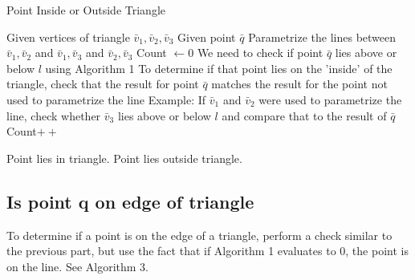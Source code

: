 \documentclass[a4paper,10pt]{scrartcl}
\begin{document}
   
\begin{algorithm}[h!]
  \caption{Point Inside or Outside Triangle}\label{}
  \begin{algorithmic}
    \State Given vertices of triangle $\bar v_1, \bar v_2, \bar v_3$
    \State Given point $\bar q$
    \State Parametrize the lines between $\bar v_1, \bar v_2$ and $\bar v_1, \bar v_3$ and $\bar v_2, \bar v_3$
    \State Count $\gets 0$
      \State We need to check if point $\bar q$ lies above or below $l$ using Algorithm 1
      \State To determine if that point lies on the 'inside' of the triangle, check that the result
      for point $\bar q$ matches the result for the point not used to parametrize the line 
      \State Example: If $\bar v_1$ and $\bar v_2$ were used to parametrize the line, check whether $\bar v_3$ lies above or below $l$ and compare
      that to the result of $\bar q$
	\State Count$++$
      \EndIf
    \EndFor
    
      \State Point lies in triangle.
    \Else
      \State Point lies outside triangle.
    \EndIf  
  \end{algorithmic}
\end{algorithm}

\newpage

\subsection{Is point q on edge of triangle}

To determine if a point is on the edge of a triangle, perform a check similar to the previous part, but use
the fact that if Algorithm 1 evaluates to $0$, the point is on the line. See Algorithm 3.
\end{document}
